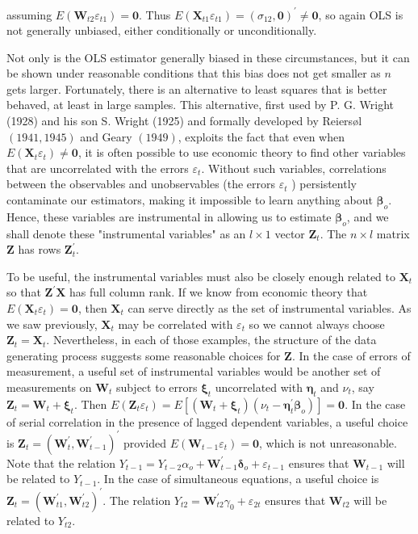 \documentclass[10pt]{article}
\begin{document}
assuming $E\left(\mathbf{W}_{t 2} \varepsilon_{t 1}\right)=\mathbf{0}$. Thus $E\left(\mathbf{X}_{t 1} \varepsilon_{t 1}\right)=\left(\sigma_{12}, \mathbf{0}\right)^{\prime} \neq \mathbf{0}$, so again OLS is not generally unbiased, either conditionally or unconditionally.

Not only is the OLS estimator generally biased in these circumstances, but it can be shown under reasonable conditions that this bias does not get smaller as $n$ gets larger. Fortunately, there is an alternative to least squares that is better behaved, at least in large samples. This alternative, first used by P. G. Wright (1928) and his son S. Wright (1925) and formally developed by Reiersøl $(1941,1945)$ and Geary $(1949)$, exploits the fact that even when $E\left(\mathbf{X}_{t} \varepsilon_{t}\right) \neq \mathbf{0}$, it is often possible to use economic theory to find other variables that are uncorrelated with the errors $\varepsilon_{t}$. Without such variables, correlations between the observables and unobservables (the errors $\varepsilon_{t}$ ) persistently contaminate our estimators, making it impossible to learn anything about $\boldsymbol{\beta}_{o}$. Hence, these variables are instrumental in allowing us to estimate $\boldsymbol{\beta}_{o}$, and we shall denote these "instrumental variables" as an $l \times 1$ vector $\mathbf{Z}_{t}$. The $n \times l$ matrix $\mathbf{Z}$ has rows $\mathbf{Z}_{t}^{\prime}$.

To be useful, the instrumental variables must also be closely enough related to $\mathbf{X}_{t}$ so that $\mathbf{Z}^{\prime} \mathbf{X}$ has full column rank. If we know from economic theory that $E\left(\mathbf{X}_{t} \varepsilon_{t}\right)=\mathbf{0}$, then $\mathbf{X}_{t}$ can serve directly as the set of instrumental variables. As we saw previously, $\mathbf{X}_{t}$ may be correlated with $\varepsilon_{t}$ so we cannot always choose $\mathbf{Z}_{t}=\mathbf{X}_{t}$. Nevertheless, in each of those examples, the structure of the data generating process suggests some reasonable choices for $\mathbf{Z}$. In the case of errors of measurement, a useful set of instrumental variables would be another set of measurements on $\mathbf{W}_{t}$ subject to errors $\boldsymbol{\xi}_{t}$ uncorrelated with $\boldsymbol{\eta}_{t}$ and $\nu_{t}$, say $\mathbf{Z}_{t}=\mathbf{W}_{t}+\boldsymbol{\xi}_{t}$. Then $E\left(\mathbf{Z}_{t} \varepsilon_{t}\right)=E\left[\left(\mathbf{W}_{t}+\boldsymbol{\xi}_{t}\right)\left(\nu_{t}-\boldsymbol{\eta}_{t}^{\prime} \boldsymbol{\beta}_{o}\right)\right]=\mathbf{0}$. In the case of serial correlation in the presence of lagged dependent variables, a useful choice is $\mathbf{Z}_{t}=\left(\mathbf{W}_{t}^{\prime}, \mathbf{W}_{t-1}^{\prime}\right)^{\prime}$ provided $E\left(\mathbf{W}_{t-1} \varepsilon_{t}\right)=\mathbf{0}$, which is not unreasonable. Note that the relation $Y_{t-1}=Y_{t-2} \alpha_{o}+\mathbf{W}_{t-1}^{\prime} \boldsymbol{\delta}_{o}+\varepsilon_{t-1}$ ensures that $\mathbf{W}_{t-1}$ will be related to $Y_{t-1}$. In the case of simultaneous equations, a useful choice is $\mathbf{Z}_{t}=\left(\mathbf{W}_{t 1}^{\prime}, \mathbf{W}_{t 2}^{\prime}\right)^{\prime}$. The relation $Y_{t 2}=\mathbf{W}_{t 2}^{\prime} \gamma_{0}+\varepsilon_{2 t}$ ensures that $\mathbf{W}_{t 2}$ will be related to $Y_{t 2}$.
\end{document}
